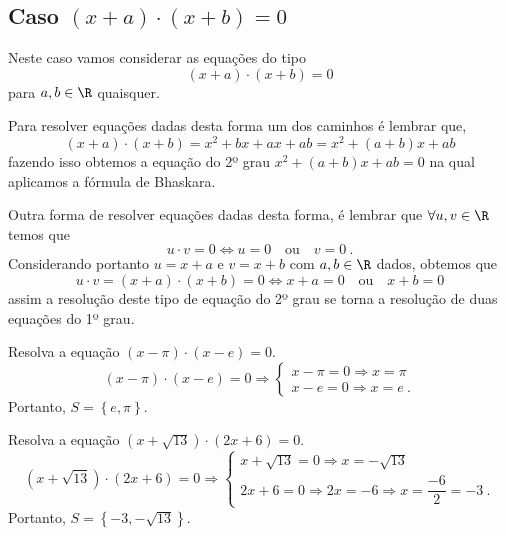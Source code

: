 \subsection{Caso \texorpdfstring{$(x+a)\cdot (x+b)= 0$}{(x+a)(x+b) = 0}}
 Neste caso vamos considerar as equações do tipo
\begin{equation}
(x+a)\cdot (x+b)= 0
\end{equation}
para $a, b \in \R$ quaisquer.

Para resolver equações dadas desta forma um dos caminhos é lembrar que,
\begin{equation}
(x+a)\cdot (x+b)= x^2 + bx + ax + ab= x^2 + (a + b)x + ab
\end{equation}
fazendo isso obtemos a equação do 2º grau $x^2 + (a + b)x + ab= 0$ na qual aplicamos a fórmula de Bhaskara.

Outra forma de resolver equações dadas desta forma, é lembrar que $\forall u, v \in \R$ temos que
\begin{equation}
u \cdot v= 0 \Leftrightarrow u= 0 \ \ \ \text{ ou } \ \ \ v=0 \ .
\end{equation}
Considerando portanto $u= x+a$ e $v= x+b$ com $a, b \in \R$ dados, obtemos que
\begin{equation}
u \cdot v= (x+a)\cdot (x+b)= 0 \Leftrightarrow x+a= 0 \ \ \ \text{ ou } \ \ \ x+b=0
\end{equation}
assim a resolução deste tipo de equação do 2º grau se torna a resolução de duas equações do 1º grau.

\begin{exem}
 Resolva a equação $(x - \pi) \cdot (x - e)= 0$.
\[(x - \pi) \cdot (x - e)= 0 \Rightarrow
\begin{cases}
 x - \pi=0 \Rightarrow x= \pi \\
 x - e= 0 \Rightarrow x= e \ .
\end{cases} \]
Portanto, $S= \left\{ e, \pi \right\}$.
 \end{exem}

 \begin{exem}
  Resolva a equação $(x + \sqrt{13}) \cdot (2x + 6)= 0$.
\[(x + \sqrt{13}) \cdot (2x + 6)= 0 \Rightarrow
\begin{cases}
 x + \sqrt{13}=0 \Rightarrow x= - \sqrt{13} \\
 2x + 6= 0 \Rightarrow 2x= -6 \Rightarrow x= \dfrac{-6}{2}= -3 \ .
\end{cases} \]
Portanto, $S= \left\{ -3, - \sqrt{13} \right\}$.
 \end{exem}

